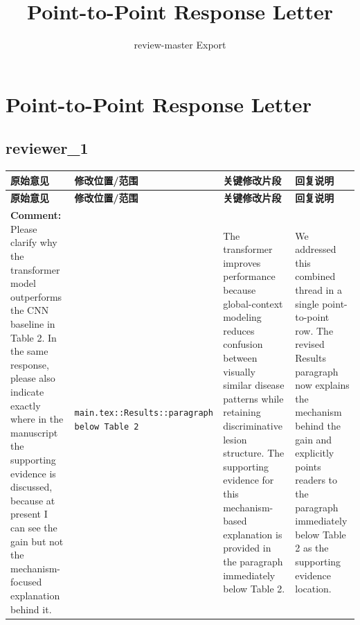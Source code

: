 \documentclass[11pt]{article}
\title{Point-to-Point Response Letter}
\author{review-master Export}
\date{}
\begin{document}
\maketitle

\section*{Point-to-Point Response Letter}

\subsection*{ reviewer\_1 }
\begin{longtable}{|p{}|p{}|p{}|p{}|}
\hline
\textbf{原始意见} & \textbf{修改位置/范围} & \textbf{关键修改片段} & \textbf{回复说明} \\
\hline
\endfirsthead
\hline
\textbf{原始意见} & \textbf{修改位置/范围} & \textbf{关键修改片段} & \textbf{回复说明} \\
\hline
\endhead
\textbf{Comment:} Please clarify why the transformer model outperforms the CNN baseline in Table 2. In the same response, please also indicate exactly where in the manuscript the supporting evidence is discussed, because at present I can see the gain but not the mechanism-focused explanation behind it. & \texttt{ main.tex::Results::paragraph below Table 2 } & {\color{blue}\ttfamily The transformer improves performance because global-context modeling reduces confusion between visually similar disease patterns while retaining discriminative lesion structure. The supporting evidence for this mechanism-based explanation is provided in the paragraph immediately below Table 2.} & We addressed this combined thread in a single point-to-point row. The revised Results paragraph now explains the mechanism behind the gain and explicitly points readers to the paragraph immediately below Table 2 as the supporting evidence location. \\
\hline
\end{longtable}
\end{document}
